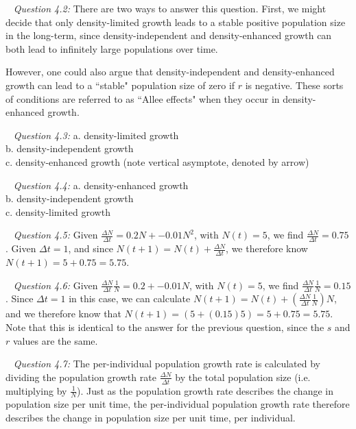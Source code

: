 \documentclass[12pt]{article}
\begin{document}
~\newline
\textit{Question 4.2:}
\newline
There are two ways to answer this question. First, we might decide that only density-limited growth leads to a stable positive population size in the long-term, since density-independent and density-enhanced growth can both lead to infinitely large populations over time.

However, one could also argue that density-independent and density-enhanced growth can lead to a ``stable" population size of zero if $r$ is negative. These sorts of conditions are referred to as ``Allee effects" when they occur in density-enhanced growth.

~\newline
\textit{Question 4.3:}
\newline
a. density-limited growth \\
b. density-independent growth \\
c. density-enhanced growth (note vertical asymptote, denoted by arrow)

~\newline
\textit{Question 4.4:}
\newline
a. density-enhanced growth \\
b. density-independent growth \\
c. density-limited growth

~\newline
\textit{Question 4.5:}
\newline
Given $\frac{\Delta N}{\Delta t} = 0.2 N + -0.01 N^2$, with $N(t) = 5$, we find $\frac{\Delta N}{\Delta t} = 0.75$.
\newline
Given $\Delta t = 1$, and since $N(t+1) = N(t) + \frac{\Delta N}{\Delta t}$, we therefore know $N(t+1) = 5 + 0.75 = 5.75$.

~\newline
\textit{Question 4.6:}
\newline
Given $\frac{\Delta N}{\Delta t}\frac{1}{N} = 0.2 + -0.01 N$, with $N(t) = 5$, we find $\frac{\Delta N}{\Delta t}\frac{1}{N} = 0.15$.
\newline
Since $\Delta t = 1$ in this case, we can calculate $N(t+1) = N(t) + \left( \frac{\Delta N}{\Delta t}\frac{1}{N} \right) N$, and we therefore know that $N(t+1) = \left(5 + (0.15) 5 \right) = 5 + 0.75 = 5.75$. Note that this is identical to the answer for the previous question, since the $s$ and $r$ values are the same.

~\newline
\textit{Question 4.7:}
\newline
The per-individual population growth rate is calculated by dividing the population growth rate $\frac{\Delta N}{\Delta t}$ by the total population size (i.e. multiplying by $\frac{1}{N}$). Just as the population growth rate describes the change in population size per unit time, the per-individual population growth rate therefore describes the change in population size per unit time, per individual.
\end{document}
